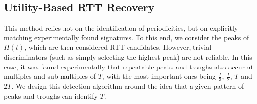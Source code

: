 
%
%


\subsection{Utility-Based \acs{RTT} Recovery}
\label{sect:utilityBasedRecovery}

This method relies not on the identification of periodicities, but on explicitly matching experimentally found signatures. 
To this end, we consider the peaks of $H(t)$, which are then considered \ac{RTT} candidates.  
However, trivial discriminators (such as simply selecting the highest peak) are not reliable. 
In this case, it was found experimentally that repeatable peaks and troughs also occur at multiples and sub-multiples of $T$, with the most important ones being $\frac{T}{3}$, $\frac{T}{2}$, $T$ and $2T$. 
We design this detection algorithm around the idea that a given pattern of peaks and troughs can identify $T$.

